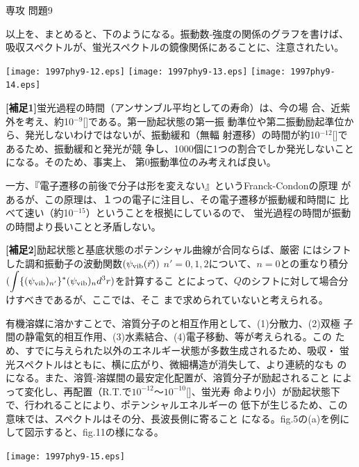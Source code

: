 \documentclass[fleqn]{jbook}
\begin{document}
\begin{answer}{専攻 問題9}{}
\begin{subanswers}
\begin{subsubanswers}
以上を、まとめると、下のようになる。振動数-強度の関係のグラフを書けば、
吸収スペクトルが、蛍光スペクトルの鏡像関係にあることに、注意されたい。
\begin{center}
\texttt{[image: 1997phy9-12.eps]}
\hspace{5mm}
\texttt{[image: 1997phy9-13.eps]}
\hspace{5mm}
\texttt{[image: 1997phy9-14.eps]}
\end{center}

{\bf{[補足1]}}蛍光過程の時間（アンサンブル平均としての寿命）は、今の場
合、近紫外を考え、約10$^{-9}$[{}]である。第一励起状態の第一振
動準位や第二振動励起準位から、発光しないわけではないが、振動緩和（無輻
射遷移）の時間が約10$^{-12}$[{}]であるため、振動緩和と発光が競
争し、1000個に1つの割合でしか発光しないことになる。そのため、事実上、
第0振動準位のみ考えれば良い。

一方、『電子遷移の前後で分子は形を変えない』というFranck-Condonの原理
があるが、この原理は、１つの電子に注目し、その電子遷移が振動緩和時間に
比べて速い（約10$^{-15}${\Unit{[s]}}）ということを根拠にしているので、
蛍光過程の時間が振動の時間より長いことと矛盾しない。

{\bf{[補足2]}}励起状態と基底状態のポテンシャル曲線が合同ならば、厳密
にはシフトした調和振動子の波動関数$(\psi_{\rm{vib}}(\vec{r}))$
$n'=0,1,2$について、$n=0$との重なり積分$(\displaystyle{\int
\{(\psi_{\rm{vib}})_{n'}\}^* (\psi_{\rm{vib}})_n d^3 r})$を計算するこ
とによって、$Q$のシフトに対して場合分けすべきであるが、ここでは、そこ
まで求められていないと考えられる。

\SubSubAnswer

\parbox[t]{100mm}{
有機溶媒に溶かすことで、溶質分子のと相互作用として、(1)分散力、(2)双極
子間の静電気的相互作用、(3)水素結合、(4)電子移動、等が考えられる。この
ため、すでに与えられた以外のエネルギー状態が多数生成されるため、吸収・
蛍光スペクトルはともに、横に広がり、微細構造が消失して、より連続的なも
のになる。また、溶質-溶媒間の最安定化配置が、溶質分子が励起されること
によって変化し、再配置（R.T.で$10^{-12}$〜$10^{-10}$[]、蛍光寿
命より小）が励起状態下で、行われることにより、ポテンシャルエネルギーの
低下が生じるため、この意味では、スペクトルはその分、長波長側に寄ること
になる。fig.5の(a)を例にして図示すると、fig.11の様になる。}\parbox[t]{60mm}
{
\begin{center}
\texttt{[image: 1997phy9-15.eps]}
\end{center}}


\end{subsubanswers}
\end{subanswers}
\end{answer}
\end{document}
